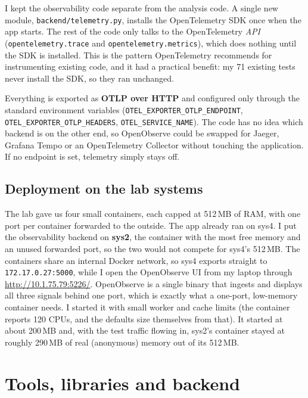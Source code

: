 \documentclass[11pt]{article}
\begin{document}
I kept the observability code separate from the analysis code. A single new module,
\texttt{backend/\allowbreak telemetry.py}, installs the OpenTelemetry SDK once when the app
starts. The rest of the code only talks to the OpenTelemetry \emph{API}
(\texttt{opentelemetry.trace} and \texttt{opentelemetry.metrics}), which does
nothing until the SDK is installed. This is the pattern OpenTelemetry recommends for
instrumenting existing code, and it had a practical benefit: my 71 existing tests
never install the SDK, so they ran unchanged.

Everything is exported as \textbf{OTLP over HTTP} and configured only through the
standard environment variables (\texttt{OTEL\_EXPORTER\_OTLP\_ENDPOINT},
\texttt{OTEL\_EXPORTER\_OTLP\_HEADERS}, \texttt{OTEL\_SERVICE\_NAME}). The code has
no idea which backend is on the other end, so OpenObserve could be swapped for
Jaeger, Grafana Tempo or an OpenTelemetry Collector without touching the
application. If no endpoint is set, telemetry simply stays off.

\subsection*{Deployment on the lab systems}
The lab gave us four small containers, each capped at 512\,MB of RAM, with one port
per container forwarded to the outside. The app already ran on sys4. I put the
observability backend on \textbf{sys2}, the container with the most free memory and
an unused forwarded port, so the two would not compete for sys4's 512\,MB. The
containers share an internal Docker network, so sys4 exports straight to
\texttt{172.17.0.27:5000}, while I open the OpenObserve UI from my laptop through
\url{http://10.1.75.79:5226/}. OpenObserve is a single binary that ingests and
displays all three signals behind one port, which is exactly what a one-port,
low-memory container needs. I started it with small worker and cache limits (the
container reports 120 CPUs, and the defaults size themselves from that). It started at
about 200\,MB and, with the test traffic flowing in, sys2's container stayed at roughly
290\,MB of real (anonymous) memory out of its 512\,MB.

\section{Tools, libraries and backend}
\end{document}
